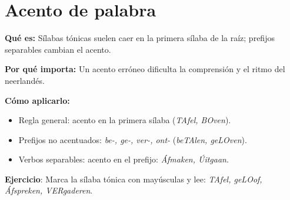 \section{Acento de palabra}
\textbf{Qué es:} Sílabas tónicas suelen caer en la primera sílaba de la raíz; prefijos separables cambian el acento.

\textbf{Por qué importa:} Un acento erróneo dificulta la comprensión y el ritmo del neerlandés.

\textbf{Cómo aplicarlo:}
\begin{itemize}[leftmargin=*]
  \item Regla general: acento en la primera sílaba (\textit{TAfel, BOven}).
	\item Prefijos no acentuados: \textit{be-, ge-, ver-, ont-} (\textit{beTAlen, geLOven}).
  \item Verbos separables: acento en el prefijo: \textit{Áfmaken, Úitgaan}.
\end{itemize}

\textbf{Ejercicio}: Marca la sílaba tónica con mayúsculas y lee: \textit{TAfel, geLOof, Áfspreken, VERgaderen}.
